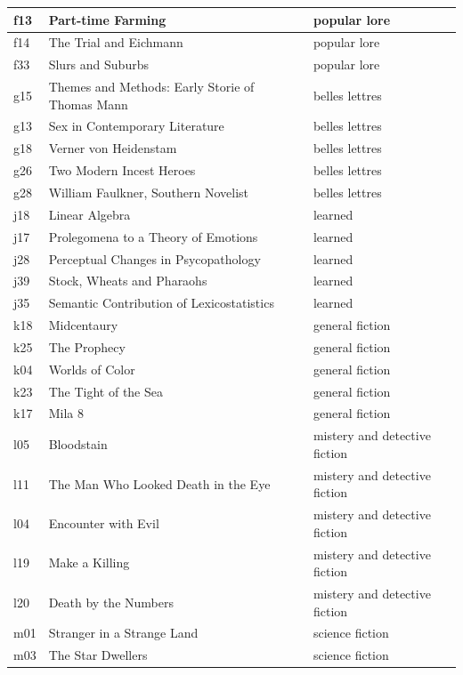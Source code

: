 \documentclass[twoside]{article}
\begin{document}
\begin{longtable}{| p{} | p{} | p{}|}
        f13 & Part-time Farming & popular lore  \\ \hline
        f14 & The Trial and Eichmann & popular lore  \\ \hline
        f33 & Slurs and Suburbs & popular lore  \\ \hline
        g15 & Themes and Methods: Early Storie of Thomas Mann & belles lettres  \\ \hline
        g13 & Sex in Contemporary Literature & belles lettres  \\ \hline
        g18 & Verner von Heidenstam & belles lettres  \\ \hline
        g26 & Two Modern Incest Heroes & belles lettres  \\ \hline
        g28 & William Faulkner, Southern Novelist & belles lettres \\ \hline
        j18 & Linear Algebra & learned  \\ \hline
        j17 & Prolegomena to a Theory of Emotions & learned  \\ \hline
        j28 & Perceptual Changes in Psycopathology & learned  \\ \hline
        j39 & Stock, Wheats and Pharaohs & learned \\ \hline
        j35 & Semantic Contribution of Lexicostatistics & learned  \\ \hline
        k18 & Midcentaury & general fiction  \\ \hline
        k25 & The Prophecy & general fiction  \\ \hline
        k04 & Worlds of Color & general fiction  \\ \hline
        k23 & The Tight of the Sea & general fiction  \\ \hline
        k17 & Mila 8 & general fiction  \\ \hline
        l05 & Bloodstain & mistery and detective fiction  \\ \hline
        l11 & The Man Who Looked Death in the Eye & mistery and detective fiction  \\ \hline
        l04 & Encounter with Evil & mistery and detective fiction  \\ \hline
        l19 & Make a Killing & mistery and detective fiction  \\ \hline
        l20 & Death by the Numbers & mistery and detective fiction  \\ \hline
        m01 & Stranger in a Strange Land & science fiction  \\ \hline
        m03 & The Star Dwellers & science fiction  \\ \hline

\end{longtable}
\end{document}
